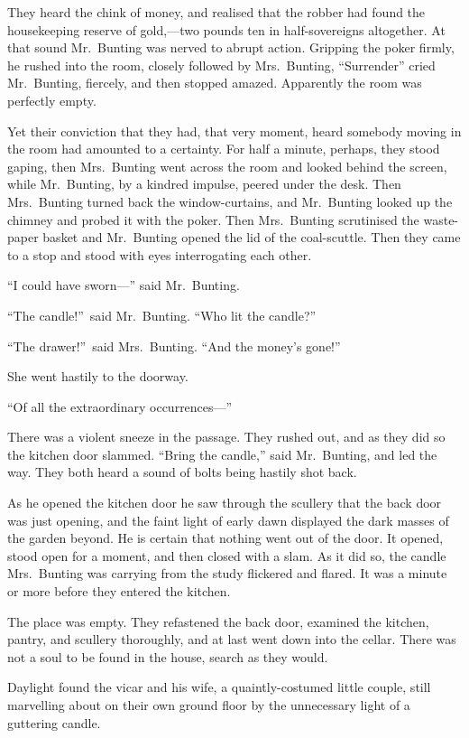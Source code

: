 They heard the chink of money, and realised that the robber had found the housekeeping reserve of gold,—two pounds ten in half-sovereigns altogether. At that sound Mr.~Bunting was nerved to abrupt action. Gripping the poker firmly, he rushed into the room, closely followed by Mrs.\ Bunting, “Surrender” cried Mr.\ Bunting, fiercely, and then stopped amazed. Apparently the room was perfectly empty.

Yet their conviction that they had, that very moment, heard somebody moving in the room had amounted to a certainty. For half a minute, perhaps, they stood gaping, then Mrs.\ Bunting went across the room and looked behind the screen, while Mr.\ Bunting, by a kindred impulse, peered under the desk. Then Mrs.\ Bunting turned back the window-curtains, and Mr.\ Bunting looked up the chimney and probed it with the poker. Then Mrs.\ Bunting scrutinised the waste-paper basket and Mr.\ Bunting opened the lid of the coal-scuttle. Then they came to a stop and stood with eyes interrogating each other.

“I could have sworn—” said Mr.\ Bunting.

“The candle!”\ said Mr.\ Bunting. “Who lit the candle?”

“The drawer!”\ said Mrs.\ Bunting. “And the money’s gone!”

She went hastily to the doorway.

“Of all the extraordinary occurrences—”

There was a violent sneeze in the passage. They rushed out, and as they did so the kitchen door slammed. “Bring the candle,” said Mr.\ Bunting, and led the way. They both heard a sound of bolts being hastily shot back.

As he opened the kitchen door he saw through the scullery that the back door was just opening, and the faint light of early dawn displayed the dark masses of the garden beyond. He is certain that nothing went out of the door. It opened, stood open for a moment, and then closed with a slam. As it did so, the candle Mrs.\ Bunting was carrying from the study flickered and flared. It was a minute or more before they entered the kitchen.

The place was empty. They refastened the back door, examined the kitchen, pantry, and scullery thoroughly, and at last went down into the cellar. There was not a soul to be found in the house, search as they would.

Daylight found the vicar and his wife, a quaintly-costumed little couple, still marvelling about on their own ground floor by the unnecessary light of a guttering candle.